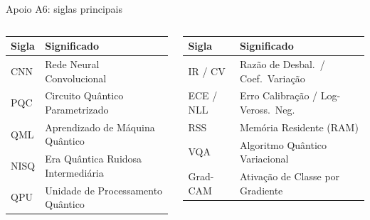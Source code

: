 \documentclass[aspectratio=169,11pt,brazil]{beamer}
\begin{document}
\begin{frame}{Apoio A6: siglas principais}
  \begin{columns}[T,onlytextwidth]
    \begin{column}{0.48\textwidth}
      {\footnotesize
      \begin{tabular}{@{}lR{4.8cm}@{}}
        \toprule
        \textbf{Sigla} & \textbf{Significado} \\
        \midrule
        CNN & Rede Neural Convolucional \\
        PQC & Circuito Quântico Parametrizado \\
        QML & Aprendizado de Máquina Quântico \\
        NISQ & Era Quântica Ruidosa Intermediária \\
        QPU & Unidade de Processamento Quântico \\
        \bottomrule
      \end{tabular}}
    \end{column}
    \begin{column}{0.48\textwidth}
      {\footnotesize
      \begin{tabular}{@{}lR{4.6cm}@{}}
        \toprule
        \textbf{Sigla} & \textbf{Significado} \\
        \midrule
        IR / CV & Razão de Desbal.\ / Coef.\ Variação \\
        ECE / NLL & Erro Calibração / Log-Veross.\ Neg. \\
        RSS & Memória Residente (RAM) \\
        VQA & Algoritmo Quântico Variacional \\
        Grad-CAM & Ativação de Classe por Gradiente \\
        \bottomrule
      \end{tabular}}
    \end{column}
  \end{columns}
\end{frame}
\end{document}
